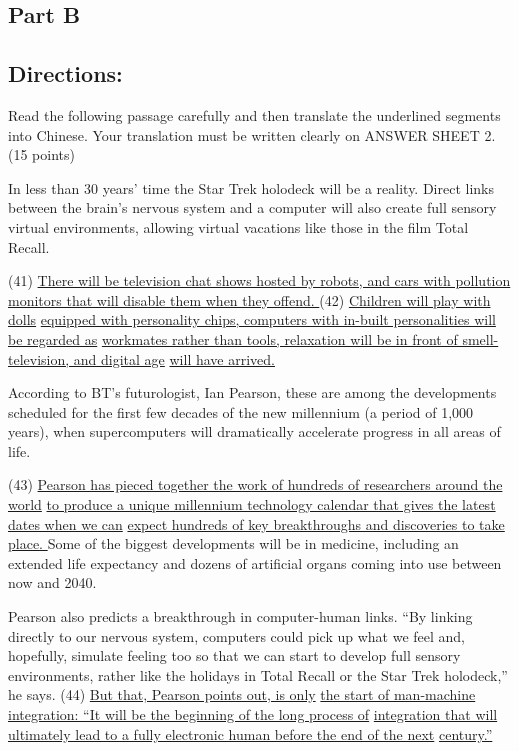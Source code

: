 \documentclass[UTF8,11pt]{ctexart}
\begin{document}
\subsection*{\textbf{Part B}}


\subsection*{\textbf{Directions:}}


Read the following passage carefully and then translate the underlined segments into Chinese. Your translation must be written clearly on ANSWER SHEET 2. (15 points)


In less than 30 years’ time the Star Trek holodeck will be a reality. Direct links between the brain’s nervous system and a computer will also create full sensory virtual environments, allowing virtual vacations like those in the film Total Recall.


(41) \uline{There will be television chat shows hosted by robots, and cars with pollution} \uline{monitors that will disable them when they offend. }(42) \uline{Children will play with dolls} \uline{equipped with personality chips, computers with in-built personalities will be regarded as} \uline{workmates rather than tools, relaxation will be in front of smell-television, and digital age} \uline{will have arrived.}


According to BT’s futurologist, Ian Pearson, these are among the developments scheduled for the first few decades of the new millennium (a period of 1,000 years), when supercomputers will dramatically accelerate progress in all areas of life.


(43) \uline{Pearson has pieced together the work of hundreds of researchers around the world} \uline{to produce a unique millennium technology calendar that gives the latest dates when we can} \uline{expect hundreds of key breakthroughs and discoveries to take place. }Some of the biggest developments will be in medicine, including an extended life expectancy and dozens of artificial organs coming into use between now and 2040.


Pearson also predicts a breakthrough in computer-human links. “By linking directly to our nervous system, computers could pick up what we feel and, hopefully, simulate feeling too so that we can start to develop full sensory environments, rather like the holidays in Total Recall or the Star Trek holodeck,” he says. (44) \uline{But that, Pearson points out, is only} \uline{the start of man-machine integration: “It will be the beginning of the long process of} \uline{integration that will ultimately lead to a fully electronic human before the end of the next} \uline{century.”}
\end{document}
